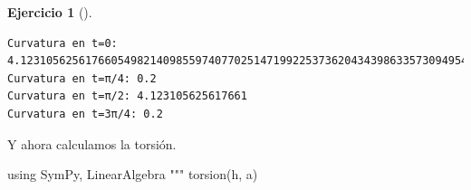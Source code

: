 \documentclass[
  a4paper,
]{scrreport}
\newenvironment{Shaded}{\begin{snugshade}}{\end{snugshade}}
\newcommand{\BuiltInTok}[1]{\textcolor[rgb]{0.00,0.23,0.31}{#1}}
\newcommand{\ConstantTok}[1]{\textcolor[rgb]{0.56,0.35,0.01}{#1}}
\newcommand{\FloatTok}[1]{\textcolor[rgb]{0.68,0.00,0.00}{#1}}
\newcommand{\FunctionTok}[1]{\textcolor[rgb]{0.28,0.35,0.67}{#1}}
\newcommand{\ImportTok}[1]{\textcolor[rgb]{0.00,0.46,0.62}{#1}}
\newcommand{\NormalTok}[1]{\textcolor[rgb]{0.00,0.23,0.31}{#1}}
\newcommand{\OperatorTok}[1]{\textcolor[rgb]{0.37,0.37,0.37}{#1}}
\newcommand{\SpecialCharTok}[1]{\textcolor[rgb]{0.37,0.37,0.37}{#1}}
\newcommand{\StringTok}[1]{\textcolor[rgb]{0.13,0.47,0.30}{#1}}
\theoremstyle{definition}
\newtheorem{exercise}{Ejercicio}[chapter]
\theoremstyle{remark}
\begin{document}
\begin{exercise}[]
\begin{tcolorbox}
\begin{Shaded}
\end{Shaded}

\begin{verbatim}
Curvatura en t=0: 4.123105625617660549821409855974077025147199225373620434398633573094954346337596
Curvatura en t=π/4: 0.2
Curvatura en t=π/2: 4.123105625617661
Curvatura en t=3π/4: 0.2
\end{verbatim}

Y ahora calculamos la torsión.

\begin{Shaded}
\begin{Highlighting}[]
\ImportTok{using} \BuiltInTok{SymPy}\NormalTok{, }\BuiltInTok{LinearAlgebra}
\StringTok{"""}
\StringTok{    torsion(h, a)}


\end{Highlighting}
\end{Shaded}
\end{tcolorbox}
\end{exercise}
\end{document}
